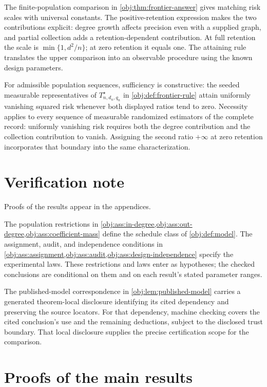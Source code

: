 \documentclass[11pt]{article}
\begin{document}
The finite-population comparison in \cref{obj:thm:frontier-answer} gives matching risk scales with universal constants. The positive-retention expression makes the two contributions explicit: degree growth affects precision even with a supplied graph, and partial collection adds a retention-dependent contribution. At full retention the scale is \(\min\{1,d^2/n\}\); at zero retention it equals one. The attaining rule translates the upper comparison into an observable procedure using the known design parameters.

For admissible population sequences, sufficiency is constructive: the seeded measurable representatives of \(T^\star_{n,d_n,q_n}\) in \cref{obj:def:frontier-rule} attain uniformly vanishing squared risk whenever both displayed ratios tend to zero. Necessity applies to every sequence of measurable randomized estimators of the complete record: uniformly vanishing risk requires both the degree contribution and the collection contribution to vanish. Assigning the second ratio \(+\infty\) at zero retention incorporates that boundary into the same characterization.


\section{Verification note}

Proofs of the results appear in the appendices.

The population restrictions in \cref{obj:ass:in-degree,obj:ass:out-degree,obj:ass:coefficient-mass} define the schedule class of \cref{obj:def:model}. The assignment, audit, and independence conditions in \cref{obj:ass:assignment,obj:ass:audit,obj:ass:design-independence} specify the experimental laws. These restrictions and laws enter as hypotheses; the checked conclusions are conditional on them and on each result's stated parameter ranges.

The published-model correspondence in \cref{obj:lem:published-model} carries a generated theorem-local disclosure identifying its cited dependency and preserving the source locators. For that dependency, machine checking covers the cited conclusion's use and the remaining deductions, subject to the disclosed trust boundary. That local disclosure supplies the precise certification scope for the comparison.


\section{Proofs of the main results}\label{sec:deferred-proofs}
\end{document}
